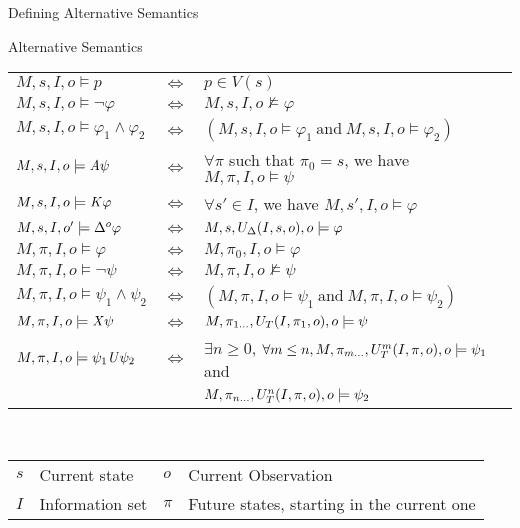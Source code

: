 \begin{frame}{Defining Alternative Semantics}
  \footnotesize
  \begin{block}{Alternative Semantics}
    \begin{tabular}{l c l}
      $M,s,I,o\models p $&$ \iff $&$ p\in V(s)$\\
      $M,s,I,o\models\neg\varphi $&$ \iff $&$ M,s,I,o\not\models\varphi$\\
      $M,s,I,o\models \varphi_1\wedge\varphi_2 $&$ \iff $&$ (M,s,I,o\models\varphi_1~\text{and}~M,s,I,o\models\varphi_2)$\\
      $M,s,I,o\models\mathit{A}\psi $&$ \iff $&$ \forall\pi$ such that $\pi_0=s$, we have $M,\pi,I,o\models\psi$\\
      \color{red!85!blue}$M,s,I,o\models\mathit{K}\varphi $&$ \iff $&\color{red!85!blue}$ \forall s'\in I$, we have $M,s',I,o\models\varphi$\\
      \color{red!85!blue}$M,s,I,o'\models\Delta^{o}\varphi $&$ \iff $&\color{red!85!blue}$ M,s,U_{\Delta}(I,s,o),o\models\varphi$\\
      $M,\pi,I,o\models\varphi $&$ \iff $&$ M,\pi_0,I,o\models\varphi$\\
      $M,\pi,I,o\models\neg\psi $&$ \iff $&$ M,\pi,I,o\not\models\psi$\\
      $M,\pi,I,o\models\psi_1\wedge\psi_2 $&$ \iff $&$ (M,\pi,I,o\models\psi_1~\text{and}~M,\pi,I,o\models\psi_2)$\\
      \color{red!85!blue}$M,\pi,I,o\models\mathit{X}\psi $&$ \iff $&\color{red!85!blue}$ M,\pi_{1\dots},U_T(I,\pi_1,o),o\models\psi$\\
      $M,\pi,I,o\models\psi_1\mathit{U}\psi_2 $&$ \iff $&$ \exists n\geq 0$, $\forall m\leq n, M,\pi_{m\dots},U_T^m(I,\pi,o),o\models\psi_1$ and\\
      & & $M,\pi_{n\dots},U_T^n(I,\pi,o),o\models\psi_2$
    \end{tabular}
  \end{block}
  \vfill
  \begin{block}{~}
    \begin{center}
    \begin{tabular}{l l | l l}
      $s$ & Current state & $o$ & Current Observation\\
      $I$ & Information set & $\pi$ & Future states, starting in the current one\\
    \end{tabular}
    \end{center}
  \end{block}
\end{frame}
  
